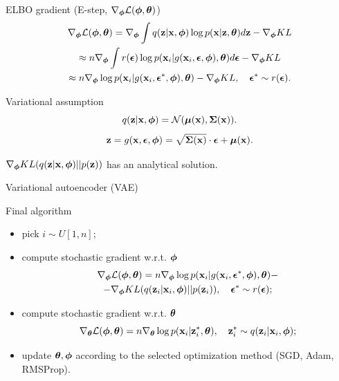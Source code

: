 \begin{frame}{ELBO gradient (E-step, $\nabla_{\bphi} \mathcal{L}(\bphi, \btheta)$)}
	\vspace{-0.3cm}
	\begin{multline*}
		\nabla_{\bphi} \mathcal{L} (\bphi, \btheta) = \nabla_{\bphi}\int q(\bz|\bx, \bphi) \log p(\bx| \bz, \btheta)d\bz  - \nabla_{\bphi} KL \\ \approx  n \nabla_{\bphi}\int r(\bepsilon) \log p(\bx_i| g(\bx_i, \bepsilon, \bphi), \btheta)d\bepsilon  - \nabla_{\bphi} KL  \\ \approx
		n \nabla_{\bphi} \log p(\bx_i| g(\bx_i, \bepsilon^*, \bphi), \btheta)  - \nabla_{\bphi} KL , \quad \bepsilon^* \sim r(\bepsilon).
	\end{multline*}
	
	\begin{block}{Variational assumption}
		\[
		q(\bz| \bx, \bphi) = \mathcal{N} (\bmu(\bx), \boldsymbol{\Sigma}(\bx)).
		\]
		\[
		\bz = g(\bx, \bepsilon, \bphi) = \sqrt{\bSigma(\bx)} \cdot \bepsilon + \bmu(\bx).
		\]
	\end{block}
	$\nabla_{\bphi} KL (q(\bz | \bx, \bphi) || p(\bz))$ has an analytical solution.
\end{frame}
\begin{frame}{Variational autoencoder (VAE)}
	\begin{block}{Final algorithm}
		\begin{itemize}
			\item pick $i \sim U[1, n]$;
			\item compute stochastic gradient w.r.t. $\bphi$
			\begin{multline*}
				\nabla_{\bphi} \mathcal{L} (\bphi, \btheta) = n \nabla_{\bphi} \log p(\bx_i | g(\bx_i, \bepsilon^*, \bphi), \btheta) - \\ - \nabla_{\bphi} KL (q(\bz_i|\bx_i, \bphi) || p(\bz_i)), \quad \bepsilon^* \sim r(\bepsilon);
			\end{multline*}
			\item compute stochastic gradient w.r.t. $\btheta$
			\[
			\nabla_{\btheta} \mathcal{L} (\bphi, \btheta) = n \nabla_{\btheta} \log p(\bx_i|\bz^*_i, \btheta), \quad \bz^*_i \sim q(\bz_i|\bx_i, \bphi);
			\]
			\item update $\btheta, \bphi$ according to the selected optimization method (SGD, Adam, RMSProp).
		\end{itemize}
	\end{block}
\end{frame}
